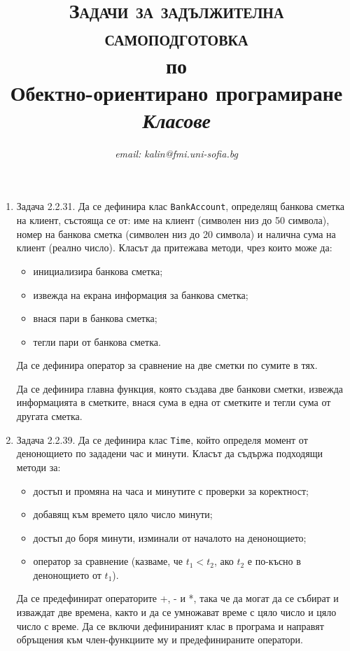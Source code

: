 \documentclass[12pt,a4paper]{article}
\author{\textit{email: kalin@fmi.uni-sofia.bg}}
\title{\textsc{Задачи за задължителна самоподготовка} \\
по \\
Обектно-ориентирано програмиране\\
\textit{Класове}}
\begin{document}
\maketitle


\begin{enumerate}

\item Задача 2.2.31. Да се дефинира клас \texttt{BankAccount}, определящ банкова сметка на клиент, състояща се от: име на клиент (символен низ до 50 символа), номер на банкова сметка (символен низ до 20 символа) и налична сума на клиент (реално число). Класът да притежава методи, чрез които може да:

\begin{itemize}
	\item инициализира банкова сметка;
	\item извежда на екрана информация за банкова сметка;
	\item внася пари в банкова сметка;
	\item тегли пари от банкова сметка.
\end{itemize}

Да се дефинира оператор за сравнение на две сметки по сумите в тях.

Да се дефинира главна функция, която създава две банкови сметки, извежда информацията в сметките, внася сума в една от сметките и тегли сума от другата сметка.

\item Задача 2.2.39. Да се дефинира клас \texttt{Time}, който определя момент от денонощието по зададени час и минути. Класът да съдържа подходящи методи за:

\begin{itemize}

 \item достъп и промяна на часа и минутите с проверки за коректност;
 \item добавящ към времето цяло число минути;
 \item достъп до боря минути, изминали от началото на денонощието;
 \item оператор за сравнение (казваме, че $t_1 < t_2$, ако $t_2$ е по-късно в денонощието от $t_1$).

\end{itemize}


Да се предефинират операторите +, - и *, така че да могат да се събират и изваждат две времена, както и да се умножават време с цяло число и цяло число с време. Да се включи дефинираният клас в програма и направят обръщения към член-функциите му и предефинираните оператори.



\end{enumerate}
\end{document}
